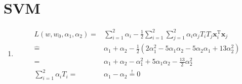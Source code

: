 \documentclass[DIN, pagenumber=false, fontsize=11pt, parskip=half]{scrartcl}
\begin{document}
    \section{SVM}
    \begin{enumerate}
        \item
        \begin{align*}
        L(w, w_0, \alpha_1, \alpha_2) =& \sum_{i=1}^2{\alpha_i} - \frac{1}{2} \sum_{i=1}^2{\sum_{j=1}^2{\alpha_i \alpha_j T_i T_j \mathbf{x}_i^\text{T} \mathbf{x}_j}} \\
        \widehat{=}& \alpha_1 + \alpha_2 - \frac{1}{2}(2 \alpha_1^2 - 5 \alpha_1 \alpha_2 - 5 \alpha_2 \alpha_1 + 13 \alpha_2^2) \\
        =& \alpha_1 + \alpha_2 - \alpha_1^2 + 5 \alpha_1 \alpha_2 -\frac{13}{2} \alpha_2^2 \\
        \sum_{i=1}^2{\alpha_i T_i} =& \alpha_1 - \alpha_2 \stackrel{!}{=} 0
        \end{align*}


\end{enumerate}
\end{document}
